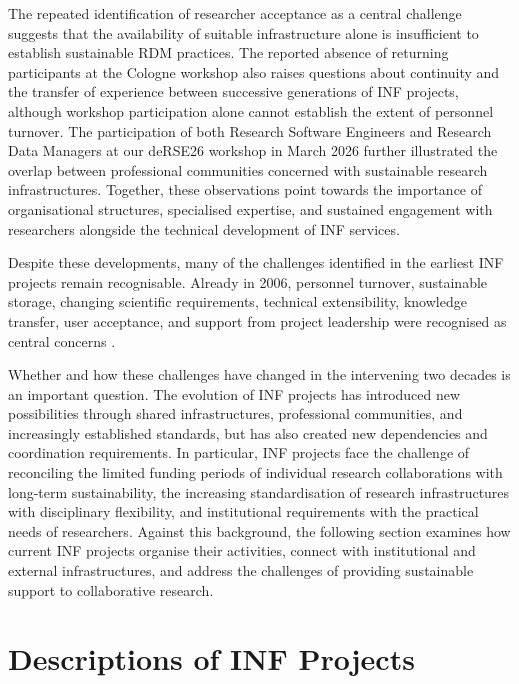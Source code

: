 \documentclass{eceasst}
\begin{document}
The repeated identification of researcher acceptance
as a central challenge suggests that the availability
of suitable infrastructure alone is insufficient to
establish sustainable RDM
practices. The reported absence of returning
participants at the Cologne workshop also raises
questions about continuity and the transfer of
experience between successive generations of INF
projects, although workshop participation alone
cannot establish the extent of personnel turnover.
The participation of both Research Software Engineers
and Research Data Managers at our deRSE26 workshop
in March 2026 further illustrated the overlap
between professional communities concerned with
sustainable research infrastructures.
Together, these observations point towards the
importance of organisational structures, specialised
expertise, and sustained engagement with researchers
alongside the technical development of INF services.


Despite these developments, many of the challenges
identified in the earliest INF projects remain
recognisable. Already in 2006, personnel turnover,
sustainable storage, changing scientific requirements,
technical extensibility, knowledge transfer, user
acceptance, and support from project leadership were
recognised as central concerns \cite{mueckschel2006}.

Whether and how these challenges have changed in the
intervening two decades is an important question.
The evolution of INF projects has introduced new
possibilities through shared infrastructures,
professional communities, and increasingly
established standards, but has also created new
dependencies and coordination requirements.
In particular, INF projects face the challenge
of reconciling the limited funding periods of
individual research collaborations with long-term
sustainability, the increasing standardisation of
research infrastructures with disciplinary
flexibility, and institutional requirements with
the practical needs of researchers.
Against this background, the following section
examines how current INF projects organise their
activities, connect with institutional and external
infrastructures, and address the challenges of
providing sustainable support to collaborative
research.

\section{Descriptions of INF Projects}
\label{sec:inf-in-germany}
\end{document}
